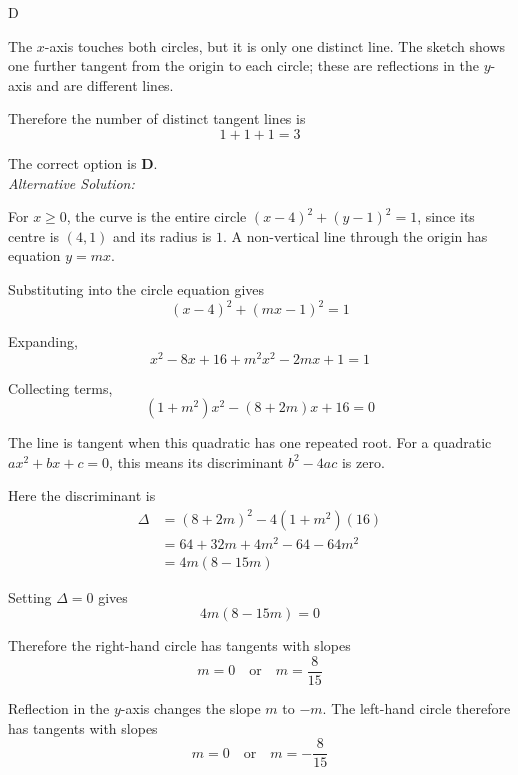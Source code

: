 \documentclass[11pt,a4paper]{article}
\begin{document}
\begin{enumerate}[label=\textbf{\arabic*.},leftmargin=*,itemsep=0pt,start=11]
\begin{djsSolution}{D}
\begin{djsSolutionFigure}
\end{djsSolutionFigure}

The $x$-axis touches both circles, but it is only one distinct line. The sketch shows one further tangent from the origin to each circle; these are reflections in the $y$-axis and are different lines.

Therefore the number of distinct tangent lines is
\[
1+1+1=3
\]

The correct option is \textbf{D}.\\[5pt]

\textit{Alternative Solution:}

For $x\ge0$, the curve is the entire circle $(x-4)^2+(y-1)^2=1$, since its centre is $(4,1)$ and its radius is $1$. A non-vertical line through the origin has equation $y=mx$.

Substituting into the circle equation gives
\[
(x-4)^2+(mx-1)^2=1
\]

Expanding,
\[
x^2-8x+16+m^2x^2-2mx+1=1
\]

Collecting terms,
\[
(1+m^2)x^2-(8+2m)x+16=0
\]

The line is tangent when this quadratic has one repeated root. For a quadratic $ax^2+bx+c=0$, this means its discriminant $b^2-4ac$ is zero.

Here the discriminant is
\[
\begin{aligned}
\Delta&=(8+2m)^2-4(1+m^2)(16)\\[5pt]
&=64+32m+4m^2-64-64m^2\\[5pt]
&=4m(8-15m)
\end{aligned}
\]

Setting $\Delta=0$ gives
\[
4m(8-15m)=0
\]

Therefore the right-hand circle has tangents with slopes
\[
m=0\quad\text{or}\quad m=\frac{8}{15}
\]

Reflection in the $y$-axis changes the slope $m$ to $-m$. The left-hand circle therefore has tangents with slopes
\[
m=0\quad\text{or}\quad m=-\frac{8}{15}
\]


\end{djsSolution}
\end{enumerate}
\end{document}
